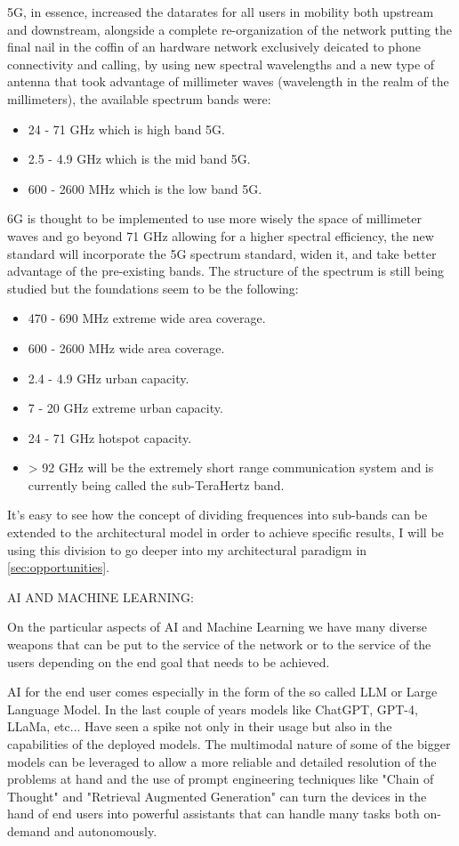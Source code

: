 5G, in essence, increased the datarates for all users in mobility both upstream and downstream,
alongside a complete re-organization of the network putting the final nail in the coffin of an
hardware network exclusively deicated to phone connectivity and calling, by using new spectral
wavelengths and a new type of antenna that took advantage of millimeter waves (wavelength in the
realm of the millimeters), the available spectrum bands were:
\begin{itemize}
	\item 24 - 71 GHz which is high band 5G.
	\item 2.5 - 4.9 GHz which is the mid band 5G.
	\item 600 - 2600 MHz which is the low band 5G.
\end{itemize}
6G is thought to be implemented to use more wisely the space of millimeter waves and go beyond 71
GHz allowing for a higher spectral efficiency, the new standard will incorporate the 5G spectrum
standard, widen it, and take better advantage of the pre-existing bands. The structure of the
spectrum is still being studied but the foundations seem to be the following:
\begin{itemize}
	\item 470 - 690 MHz extreme wide area coverage.
	\item 600 - 2600 MHz wide area coverage.
	\item 2.4 - 4.9 GHz urban capacity.
	\item 7 - 20 GHz extreme urban capacity.
	\item 24 - 71 GHz hotspot capacity.
	\item > 92 GHz will be the extremely short range communication system and is currently being
	      called the sub-TeraHertz band.
\end{itemize}
It's easy to see how the concept of dividing frequences into sub-bands can be extended to the
architectural model in order to achieve specific results, I will be using this division to go
deeper into my architectural paradigm in \ref{sec:opportunities}.

\bigskip
\noindent
AI AND MACHINE LEARNING:
\label{ssec:ai-ml}

On the particular aspects of AI and Machine Learning we have many diverse weapons that can be put to
the service of the network or to the service of the users depending on the end goal that needs to
be achieved.

AI for the end user comes especially in the form of the so called LLM or Large Language Model. In
the last couple of years models like ChatGPT, GPT-4, LLaMa, etc... Have seen a spike not only in
their usage but also in the capabilities of the deployed models. The multimodal
nature of some of the bigger models can be leveraged to allow a more reliable and detailed
resolution of the problems at hand and the use of prompt engineering techniques like "Chain of
Thought" and "Retrieval Augmented Generation" can turn the devices in the hand of end users into
powerful assistants that can handle many tasks both on-demand and autonomously.

